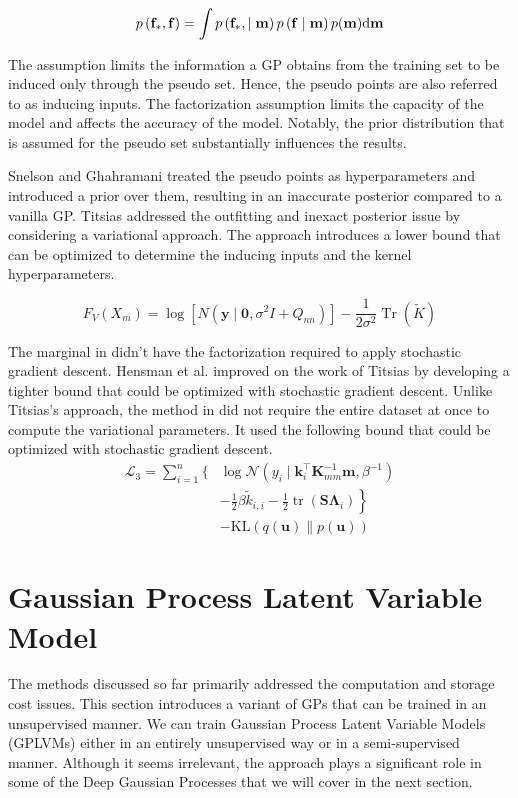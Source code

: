 \documentclass[letterpaper,11pt]{extarticle}
\begin{document}
$$
p\left(\mathbf{f}_{*}, \mathbf{f}\right) =\int p\left(\mathbf{f}_{*}, \mid \mathbf{m}\right)p\left(\mathbf{f} \mid \mathbf{m}\right) p(\mathbf{m}) \mathrm{d} \mathbf{m} \\
$$

The assumption limits the information a GP obtains from the training set to be induced only through the pseudo set. Hence, the pseudo points are also referred to as inducing inputs. The factorization assumption limits the capacity of the model and affects the accuracy of the model. Notably, the prior distribution that is assumed for the pseudo set substantially influences the results. 

Snelson and Ghahramani \cite{SnelsonEZ06} treated the pseudo points as hyperparameters and introduced a prior over them, resulting in an inaccurate posterior compared to a vanilla GP. Titsias \cite{Titsias09} addressed the outfitting and inexact posterior issue by considering a variational approach. The approach introduces a lower bound that can be optimized to determine the inducing inputs and the kernel hyperparameters. 

$$
F_{V}\left(X_{m}\right)=\log \left[N\left(\mathbf{y} \mid \mathbf{0}, \sigma^{2} I+Q_{n n}\right)\right]-\frac{1}{2 \sigma^{2}} \operatorname{Tr}(\widetilde{K})
$$

The marginal in \cite{Titsias09} didn't have the factorization required to apply stochastic gradient descent. Hensman et al. \cite{HensmanFL13} improved on the work of Titsias \cite{Titsias09} by developing a tighter bound that could be optimized with stochastic gradient descent. Unlike Titsias's approach, the method in \cite{HensmanFL13} did not require the entire dataset at once to compute the variational parameters. It used the following bound that could be optimized with stochastic gradient descent. 
$$
\begin{aligned}
\mathcal{L}_{3}=\sum_{i=1}^{n}\{& \log \mathcal{N}\left(y_{i} \mid \mathbf{k}_{i}^{\top} \mathbf{K}_{m m}^{-1} \mathbf{m}, \beta^{-1}\right) \\
&\left.-\frac{1}{2} \beta \widetilde{k}_{i, i}-\frac{1}{2} \operatorname{tr}\left(\mathbf{S} \mathbf{\Lambda}_{i}\right)\right\} \\
&-\mathrm{KL}(q(\mathbf{u}) \| p(\mathbf{u}))
\end{aligned}
$$

\section{Gaussian Process Latent Variable Model}
The methods discussed so far primarily addressed the computation and storage cost issues. This section introduces a variant of GPs that can be trained in an unsupervised manner. We can train Gaussian Process Latent Variable Models (GPLVMs) either in an entirely unsupervised way or in a semi-supervised manner. Although it seems irrelevant, the approach plays a significant role in some of the Deep Gaussian Processes that we will cover in the next section. 
\end{document}
